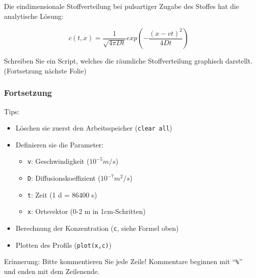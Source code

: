       \secMexercise
      \begin{frame}
          \frameMexercise
          \begin{exercise}
              \sloppy
              Die eindimensionale Stoffverteilung bei pulsartiger Zugabe des Stoffes hat die analytische Lösung:

              \begin{displaymath}
                  c(t,x) = \frac{1}{\sqrt{4 \pi Dt}} exp \left( - \frac{(x-vt)^{2}}{4Dt} \right)
              \end{displaymath}

              \vspace{0.5cm}

              Schreiben Sie ein Script, welches die räumliche Stoffverteilung graphisch darstellt. (Fortsetzung nächste Folie)\\
          \end{exercise}
      \end{frame}

      \begin{frame}
          \frametitle{Fortsetzung}
          \begin{exercise}
              \sloppy
              Tips:

              \vspace{0.2cm}

              \begin{itemize}
                  \item Löschen sie zuerst den Arbeitsspeicher (\texttt{clear all})
                  \item Definieren sie die Parameter:
                  \begin{itemize}
                      \item \texttt{v}: Geschwindigkeit ($10^{-5} m/s$)
                      \item \texttt{D}: Diffusionskoeffizient ($10^{-7} m^{2}/s$)
                      \item \texttt{t}: Zeit (1 d = 86400 s)
                      \item \texttt{x}: Ortsvektor (0-2 m in 1cm-Schritten)
                  \end{itemize}
                  \item Berechnung der Konzentration (\texttt{c}, siehe Formel oben)
                  \item Plotten des Profils (\texttt{plot(x,c)})
              \end{itemize}

              \vspace{0.2cm}

              \alert{Erinnerung}: Bitte kommentieren Sie jede Zeile! Kommentare beginnen mit ``\texttt{\%}'' und enden mit dem Zeilenende.

          \end{exercise}
      \end{frame}

